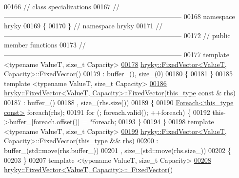 \begin{DoxyCode}
00166 \textcolor{comment}{// class specializations}
00167 \textcolor{comment}{//
      ------------------------------------------------------------------------------}
00168 \textcolor{keyword}{namespace }hryky
00169 \{
00170 \} \textcolor{comment}{// namespace hryky}
00171 \textcolor{comment}{//
      ------------------------------------------------------------------------------}
00172 \textcolor{comment}{// public member functions}
00173 \textcolor{comment}{//
      ------------------------------------------------------------------------------}
00177 \textcolor{comment}{}\textcolor{keyword}{template} <\textcolor{keyword}{typename} ValueT, \textcolor{keywordtype}{size\_t} Capacity>
\hypertarget{fixed__vector_8h_source_l00178}{}\hyperlink{classhryky_1_1_fixed_vector_a5d232c24602527464caa5aa8f6a83554}{00178} \hyperlink{classhryky_1_1_fixed_vector_a5d232c24602527464caa5aa8f6a83554}{hryky::FixedVector<ValueT, Capacity>::FixedVector}()
00179     : buffer\_(), size\_(0)
00180 \{
00181 \}
00185 \textcolor{keyword}{template} <\textcolor{keyword}{typename} ValueT, \textcolor{keywordtype}{size\_t} Capacity>
\hypertarget{fixed__vector_8h_source_l00186}{}\hyperlink{classhryky_1_1_fixed_vector_a007d4a0f2cf805378371dfec216e4cf1}{00186} \hyperlink{classhryky_1_1_fixed_vector}{hryky::FixedVector<ValueT, Capacity>::FixedVector}(\hyperlink{classhryky_1_1_fixed_vector}{this_type} \textcolor{keyword}{const} & rhs)
00187     : buffer\_()
00188       , size\_(rhs.size())
00189 \{
00190     \hyperlink{classhryky_1_1_foreach}{Foreach<this_type const>} \textcolor{keywordflow}{foreach}(rhs);
00191     \textcolor{keywordflow}{for} (; \textcolor{keywordflow}{foreach}.valid(); ++\textcolor{keywordflow}{foreach}) \{
00192         this->buffer\_[\textcolor{keywordflow}{foreach}.offset()] = *\textcolor{keywordflow}{foreach};
00193     \}
00194 \}
00198 \textcolor{keyword}{template} <\textcolor{keyword}{typename} ValueT, \textcolor{keywordtype}{size\_t} Capacity>
\hypertarget{fixed__vector_8h_source_l00199}{}\hyperlink{classhryky_1_1_fixed_vector_a73fd9e2ea6b89b386f10e745625fbef9}{00199} \hyperlink{classhryky_1_1_fixed_vector}{hryky::FixedVector<ValueT, Capacity>::FixedVector}(\hyperlink{classhryky_1_1_fixed_vector}{this_type} && rhs)
00200     : buffer\_(std::move(rhs.buffer\_))
00201       , size\_(std::move(rhs.size\_))
00202 \{
00203 \}
00207 \textcolor{keyword}{template} <\textcolor{keyword}{typename} ValueT, \textcolor{keywordtype}{size\_t} Capacity>
\hypertarget{fixed__vector_8h_source_l00208}{}\hyperlink{classhryky_1_1_fixed_vector_a690537d2311ebad8ee5d89acbef71800}{00208} \hyperlink{classhryky_1_1_fixed_vector}{hryky::FixedVector<ValueT, Capacity>::~FixedVector}()

\end{DoxyCode}
